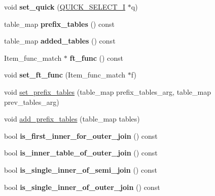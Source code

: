 \begin{DoxyCompactItemize}
\item 
\mbox{\label{classQEP__shared_ad119802966edb2e96589bb146ca4348d}} 
void {\bfseries set\+\_\+quick} (\mbox{\hyperlink{classQUICK__SELECT__I}{Q\+U\+I\+C\+K\+\_\+\+S\+E\+L\+E\+C\+T\+\_\+I}} $\ast$q)
\item 
\mbox{\label{classQEP__shared_aac25dcc843dd53a3b08794d9357b022a}} 
table\+\_\+map {\bfseries prefix\+\_\+tables} () const
\item 
\mbox{\label{classQEP__shared_a05d7c09b6e5aa917e6f90e99dbf5a033}} 
table\+\_\+map {\bfseries added\+\_\+tables} () const
\item 
\mbox{\label{classQEP__shared_a6b2401726fbb15040df31559b857cd03}} 
Item\+\_\+func\+\_\+match $\ast$ {\bfseries ft\+\_\+func} () const
\item 
\mbox{\label{classQEP__shared_a504f9955aff30f227b303fcda3743273}} 
void {\bfseries set\+\_\+ft\+\_\+func} (Item\+\_\+func\+\_\+match $\ast$f)
\item 
void \mbox{\hyperlink{classQEP__shared_aa5920a37261a4d8c5d932450c8c8533a}{set\+\_\+prefix\+\_\+tables}} (table\+\_\+map prefix\+\_\+tables\+\_\+arg, table\+\_\+map prev\+\_\+tables\+\_\+arg)
\item 
void \mbox{\hyperlink{classQEP__shared_a3cee2b471eae05ce298f5356a9d685eb}{add\+\_\+prefix\+\_\+tables}} (table\+\_\+map tables)
\item 
\mbox{\label{classQEP__shared_a21fe9f7fe9cc69597fde9060e9ae7041}} 
bool {\bfseries is\+\_\+first\+\_\+inner\+\_\+for\+\_\+outer\+\_\+join} () const
\item 
\mbox{\label{classQEP__shared_a3d6fabf83f10a91fd245bcc1fb9e8feb}} 
bool {\bfseries is\+\_\+inner\+\_\+table\+\_\+of\+\_\+outer\+\_\+join} () const
\item 
\mbox{\label{classQEP__shared_a38f441406d498d7dd7b1c6b0567bc937}} 
bool {\bfseries is\+\_\+single\+\_\+inner\+\_\+of\+\_\+semi\+\_\+join} () const
\item 
\mbox{\label{classQEP__shared_a284e4041af9ca1e6a4cf4b4591cb9e3d}} 
bool {\bfseries is\+\_\+single\+\_\+inner\+\_\+of\+\_\+outer\+\_\+join} () const
\end{DoxyCompactItemize}
